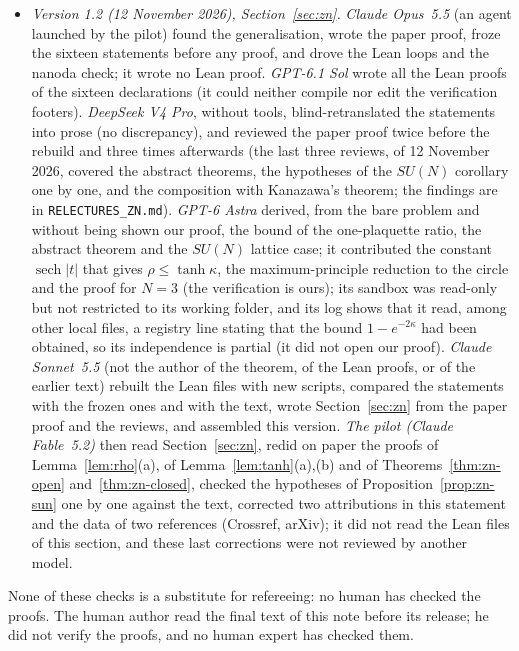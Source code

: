 \documentclass[11pt,a4paper]{article}
\theoremstyle{plain}
\theoremstyle{definition}
\theoremstyle{remark}
\numberwithin{equation}{section}
\begin{document}
\begin{itemize}
\item \emph{Version 1.2 (12 November 2026), Section~\ref{sec:zn}.} \emph{Claude Opus~5.5} (an agent launched by the pilot) found the generalisation, wrote the paper proof, froze the sixteen statements before any proof, and drove the Lean loops and the nanoda check; it wrote no Lean proof. \emph{GPT-6.1 Sol} wrote all the Lean proofs of the sixteen declarations (it could neither compile nor edit the verification footers). \emph{DeepSeek V4 Pro}, without tools, blind-retranslated the statements into prose (no discrepancy), and reviewed the paper proof twice before the rebuild and three times afterwards (the last three reviews, of 12 November 2026, covered the abstract theorems, the hypotheses of the $SU(N)$ corollary one by one, and the composition with Kanazawa's theorem; the findings are in \texttt{RELECTURES\_ZN.md}). \emph{GPT-6 Astra} derived, from the bare problem and without being shown our proof, the bound of the one-plaquette ratio, the abstract theorem and the $SU(N)$ lattice case; it contributed the constant $\operatorname{sech}|t|$ that gives $\rho\le\tanh\kappa$, the maximum-principle reduction to the circle and the proof for $N=3$ (the verification is ours); its sandbox was read-only but not restricted to its working folder, and its log shows that it read, among other local files, a registry line stating that the bound $1-e^{-2\kappa}$ had been obtained, so its independence is partial (it did not open our proof). \emph{Claude Sonnet~5.5} (not the author of the theorem, of the Lean proofs, or of the earlier text) rebuilt the Lean files with new scripts, compared the statements with the frozen ones and with the text, wrote Section~\ref{sec:zn} from the paper proof and the reviews, and assembled this version. \emph{The pilot (Claude Fable~5.2)} then read Section~\ref{sec:zn}, redid on paper the proofs of Lemma~\ref{lem:rho}(a), of Lemma~\ref{lem:tanh}(a),(b) and of Theorems~\ref{thm:zn-open} and~\ref{thm:zn-closed}, checked the hypotheses of Proposition~\ref{prop:zn-sun} one by one against the text, corrected two attributions in this statement and the data of two references (Crossref, arXiv); it did not read the Lean files of this section, and these last corrections were not reviewed by another model.
\end{itemize}
None of these checks is a substitute for refereeing: no human has checked the proofs.
The human author read the final text of this note before its release; he did not verify the proofs, and no human expert has checked them.
\end{document}
